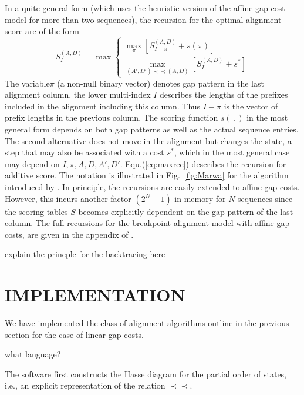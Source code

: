 \documentclass[a4paper,10pt]{article}
\newcommand{\TODO}[1]{\begingroup\color{red}#1\endgroup}
\newcommand{\pprec}{\mathrel{\prec\!\!\!\prec}}
\begin{document}
In a quite general form (which uses the heuristic version of the affine gap
cost model for more than two sequences), the recursion for the optimal
alignment score are of the form
\begin{equation} 
  S^{(A,D)}_I = \max 
      \begin{cases}
        \displaystyle\max_{\pi} 
            \left[ S^{(A,D)}_{I-\pi} + s(\pi)
                    \right]
        \\
        \displaystyle\max_{(A',D')\pprec(A,D)}  
                    \left[ S^{(A,D)}_I + s^*\right]
       \end{cases} 
\label{eq:maxrec}
\end{equation}
The variable$\pi$ (a non-null binary vector) denotes gap pattern in the
last alignment column, the lower multi-index $I$ describes the lengths of
the prefixes included in the alignment including this column.  Thus $I-\pi$
is the vector of prefix lengths in the previous column. The scoring
function $s(\,.\,)$ in the most general form depends on both gap patterns
as well as the actual sequence entries. The second alternative does not
move in the alignment but changes the state, a step that may also be
associated with a cost $s^*$, which in the most general case may depend on
$I,\pi,A,D,A',D'$. Equ.(\ref{eq:maxrec}) describes the recursion for
additive score.  The notation is illustrated in Fig.~\ref{fig:Marwa} for
the algorithm introduced by \citet{AlArab:17a}. In principle, the
recursions are easily extended to affine gap costs. However, this incurs
another factor $(2^N-1)$ in memory for $N$ sequences since the scoring
tables $S$ becomes explicitly dependent on the gap pattern of the last
column. The full recursions for the breakpoint alignment model with affine
gap costs, are given in the appendix of \citet{Retzlaff:18a}.

\TODO{explain the princple for the backtracing here} 

\section{\uppercase{Implementation}}

We have implemented the class of alignment algorithms outline in the
previous section for the case of linear gap costs.

\TODO{what language?} 

The software first constructs the Hasse diagram for the partial order
of states, i.e., an explicit representation of the relation $\pprec$.
\end{document}
